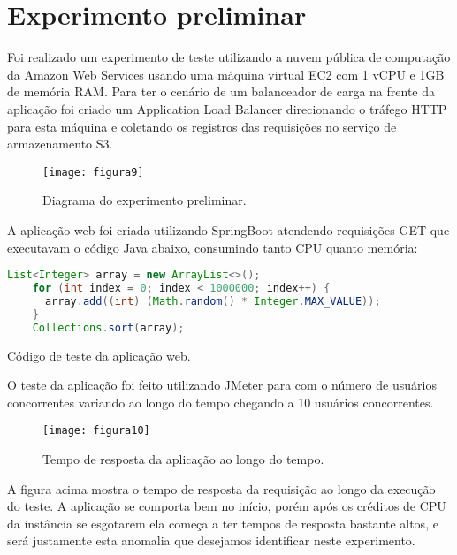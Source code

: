 
\chapter{Experimento preliminar}
\label{cap:experimento-preliminar}

Foi realizado um experimento de teste utilizando a nuvem pública de computação
da Amazon Web Services usando uma máquina virtual EC2 com 1 vCPU e 1GB de
memória RAM. Para ter o cenário de um balanceador de carga na frente da
aplicação foi criado um Application Load Balancer direcionando o tráfego
HTTP para esta máquina e coletando os registros das requisições no serviço
de armazenamento S3.

\begin{figure}
  \centering
  \texttt{[image: figura9]}
  \caption{Diagrama do experimento preliminar.\label{fig:diagrama-do-experimento-preliminar}}
\end{figure}

A aplicação web foi criada utilizando SpringBoot atendendo requisições GET
que executavam o código Java abaixo, consumindo tanto CPU quanto memória:

\begin{program}
  \centering
  \begin{lstlisting}[language=Java, style=wider]
    List<Integer> array = new ArrayList<>();
    for (int index = 0; index < 1000000; index++) {
      array.add((int) (Math.random() * Integer.MAX_VALUE));
    }
    Collections.sort(array);
  \end{lstlisting}
  \caption{Código de teste da aplicação web.\label{prog:java}}
\end{program}

O teste da aplicação foi feito utilizando JMeter para com o número de usuários
concorrentes variando ao longo do tempo chegando a 10 usuários concorrentes.

\begin{figure}
  \centering
  \texttt{[image: figura10]}
  \caption{Tempo de resposta da aplicação ao longo do tempo.\label{fig:tempo-de-resposta-da-aplicação-ao-longo-do-tempo}}
\end{figure}

A figura acima mostra o tempo de resposta da requisição ao longo da execução
do teste. A aplicação se comporta bem no início, porém após os créditos de
CPU da instância se esgotarem ela começa a ter tempos de resposta bastante
altos, e será justamente esta anomalia que desejamos identificar neste
experimento.

